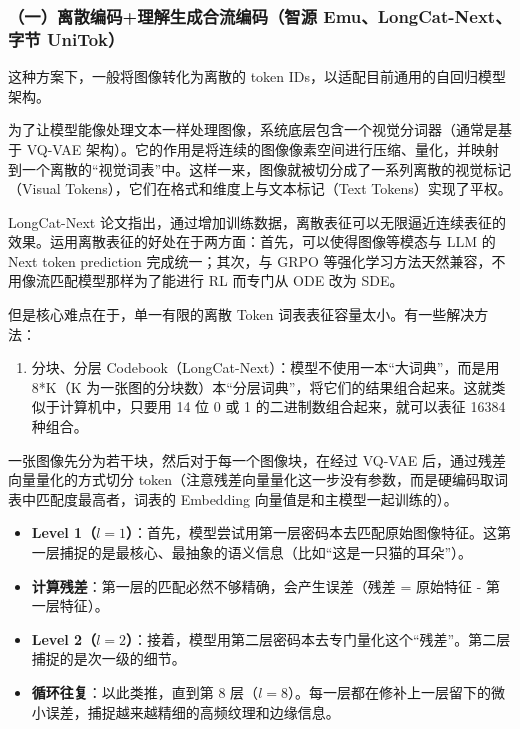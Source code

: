 \hypertarget{ux4e00ux79bbux6563ux7f16ux7801ux7406ux89e3ux751fux6210ux5408ux6d41ux7f16ux7801ux667aux6e90-emulongcat-nextux5b57ux8282-unitok}{%
\subsubsection{（一）离散编码+理解生成合流编码（智源 Emu、LongCat-Next、字节 UniTok）}\label{ux4e00ux79bbux6563ux7f16ux7801ux7406ux89e3ux751fux6210ux5408ux6d41ux7f16ux7801ux667aux6e90-emulongcat-nextux5b57ux8282-unitok}}

这种方案下，一般将图像转化为离散的 token IDs，以适配目前通用的自回归模型架构。

为了让模型能像处理文本一样处理图像，系统底层包含一个视觉分词器（通常是基于 VQ-VAE 架构）。它的作用是将连续的图像像素空间进行压缩、量化，并映射到一个离散的``视觉词表''中。这样一来，图像就被切分成了一系列离散的视觉标记（Visual Tokens），它们在格式和维度上与文本标记（Text Tokens）实现了平权。

LongCat-Next 论文指出，通过增加训练数据，离散表征可以无限逼近连续表征的效果。运用离散表征的好处在于两方面：首先，可以使得图像等模态与 LLM 的 Next token prediction 完成统一；其次，与 GRPO 等强化学习方法天然兼容，不用像流匹配模型那样为了能进行 RL 而专门从 ODE 改为 SDE。

但是核心难点在于，单一有限的离散 Token 词表表征容量太小。有一些解决方法：

\begin{enumerate}
\def\labelenumi{\arabic{enumi}.}
\tightlist
\item
  分块、分层 Codebook（LongCat-Next）：模型不使用一本``大词典''，而是用 8*K（K 为一张图的分块数）本``分层词典''，将它们的结果组合起来。这就类似于计算机中，只要用 14 位 0 或 1 的二进制数组合起来，就可以表征 16384 种组合。
\end{enumerate}

一张图像先分为若干块，然后对于每一个图像块，在经过 VQ-VAE 后，通过残差向量量化的方式切分 token（注意残差向量量化这一步没有参数，而是硬编码取词表中匹配度最高者，词表的 Embedding 向量值是和主模型一起训练的）。

\begin{itemize}
\tightlist
\item
  \textbf{Level 1（\(l=1\)）}：首先，模型尝试用第一层密码本去匹配原始图像特征。这第一层捕捉的是最核心、最抽象的语义信息（比如``这是一只猫的耳朵''）。
\item
  \textbf{计算残差}：第一层的匹配必然不够精确，会产生误差（残差 = 原始特征 - 第一层特征）。
\item
  \textbf{Level 2（\(l=2\)）}：接着，模型用第二层密码本去专门量化这个``残差''。第二层捕捉的是次一级的细节。
\item
  \textbf{循环往复}：以此类推，直到第 8 层（\(l=8\)）。每一层都在修补上一层留下的微小误差，捕捉越来越精细的高频纹理和边缘信息。
\end{itemize}

